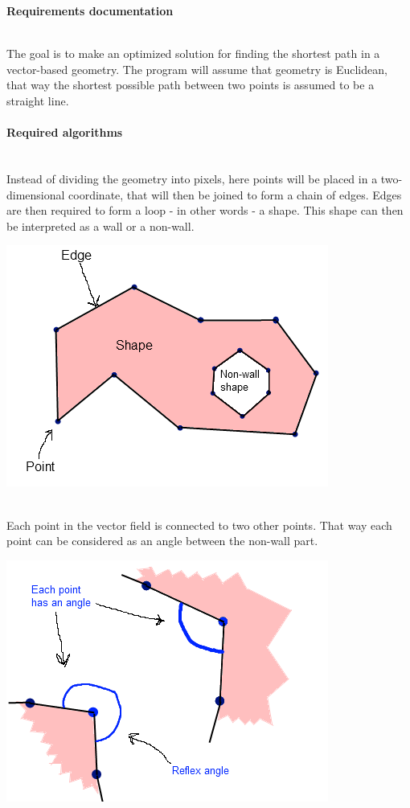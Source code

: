 \documentclass[a4paper,12pt]{article}
\begin{document}
\centerline{\huge \textbf{Requirements documentation}} \hspace*{\fill}
\\
The goal is to make an optimized solution for finding the shortest path in a vector-based geometry. The program will assume that geometry is Euclidean, that way the shortest possible path between two points is assumed to be a straight line.
\paragraph{Required algorithms} \hspace{0pt} \\
Instead of dividing the geometry into pixels, here points will be placed in a two-dimensional
coordinate, that will then be joined to form a chain of edges. Edges are then required to form
a loop - in other words - a shape. This shape can then be interpreted as a wall or a non-wall.
\\
\centerline{\includegraphics[scale=0.5]{pointedgeshape.png}} \hspace*{\fill}
\\
Each point in the vector field is connected to two other points. That way each point can be considered as an angle between the non-wall part.
\\
\centerline{\includegraphics[scale=0.5]{pointsandangles.png}} \hspace*{\fill}
\end{document}
